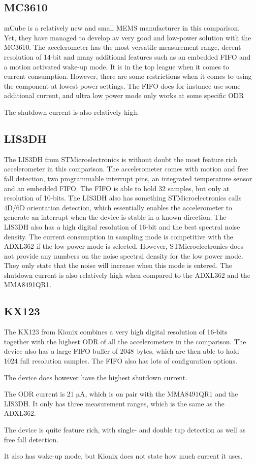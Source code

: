 \subsection{MC3610}
mCube is a relatively new and small MEMS manufacturer in this comparison. Yet, they have managed to develop av very good and low-power solution with the MC3610. The accelerometer has the most versatile measurement range, decent resolution of 14-bit and many additional features such as an embedded FIFO and a motion activated wake-up mode. It is in the top league when it comes to current consumption. However, there are some restrictions when it comes to using the component at lowest power settings. The FIFO does for instance use some additional current, and ultra low power mode only works at some specific ODR

The shutdown current is also relatively high.

\subsection{LIS3DH}

The LIS3DH from STMicroelectronics is without doubt the most feature rich accelerometer in this comparison. The accelerometer comes with motion and free fall detection, two programmable interrupt pins, an integrated temperature sensor and an embedded FIFO. The FIFO is able to hold 32 samples, but only at resolution of 10-bits. The LIS3DH also has something STMicroelectronics calls 4D/6D orientation detection, which essentially enables the accelerometer to generate an interrupt when the device is stable in a known direction. The LIS3DH also has a high digital resolution of 16-bit and the best spectral noise density. The current consumption in sampling mode is competitive with the ADXL362 if the low power mode is selected. However, STMicroelectronics does not provide any numbers on the noise spectral density for the low power mode. They only state that the noise will increase when this mode is entered. The shutdown current is also relatively high when compared to the ADXL362 and the MMA8491QR1. 

\subsection{KX123}

The KX123 from Kionix combines a very high digital resolution of 16-bits together with the highest ODR of all the accelerometers in the comparison. The device also has a large FIFO buffer of 2048 bytes, which are then able to hold 1024 full resolution samples. The FIFO also has lots of configuration options. 

The device does however have the highest shutdown current. 

The ODR current is 21 $\si{\micro\ampere}$, which is on pair with the MMA8491QR1 and the LIS3DH. It only has three measurement ranges, which is the same as the ADXL362.

The device is quite feature rich, with single- and double tap detection as well as free fall detection.

It also has wake-up mode, but Kionix does not state how much current it uses.